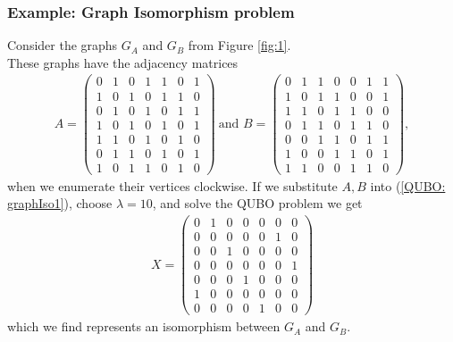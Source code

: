 \documentclass{article}
\begin{document}
\subsubsection{Example: Graph Isomorphism problem}
Consider the graphs \(G_A\) and \(G_B\) from Figure \ref{fig:1}. \\

\noindent These graphs have the adjacency matrices
\begin{align*}
    A = \begin{pmatrix}
        0 & 1 & 0 & 1 & 1 & 0 & 1 \\
        1 & 0 & 1 & 0 & 1 & 1 & 0 \\
        0 & 1 & 0 & 1 & 0 & 1 & 1 \\
        1 & 0 & 1 & 0 & 1 & 0 & 1 \\
        1 & 1 & 0 & 1 & 0 & 1 & 0 \\
        0 & 1 & 1 & 0 & 1 & 0 & 1 \\
        1 & 0 & 1 & 1 & 0 & 1 & 0
    \end{pmatrix} \: \text{and }
    B = \begin{pmatrix}
        0 & 1 & 1 & 0 & 0 & 1 & 1 \\
        1 & 0 & 1 & 1 & 0 & 0 & 1 \\
        1 & 1 & 0 & 1 & 1 & 0 & 0 \\
        0 & 1 & 1 & 0 & 1 & 1 & 0 \\
        0 & 0 & 1 & 1 & 0 & 1 & 1 \\
        1 & 0 & 0 & 1 & 1 & 0 & 1 \\
        1 & 1 & 0 & 0 & 1 & 1 & 0
    \end{pmatrix},
\end{align*}
when we enumerate their vertices clockwise. If we substitute \(A, B\) into (\ref{QUBO: graphIso1}), choose \(\lambda = 10\), and solve the QUBO problem we get
\begin{align*}
    X = \begin{pmatrix}
        0 & 1 & 0 & 0 & 0 & 0 & 0 \\
        0 & 0 & 0 & 0 & 0 & 1 & 0 \\
        0 & 0 & 1 & 0 & 0 & 0 & 0 \\
        0 & 0 & 0 & 0 & 0 & 0 & 1 \\
        0 & 0 & 0 & 1 & 0 & 0 & 0 \\
        1 & 0 & 0 & 0 & 0 & 0 & 0 \\
        0 & 0 & 0 & 0 & 1 & 0 & 0
    \end{pmatrix}
\end{align*}
which we find represents an isomorphism between \(G_A\) and \(G_B\).\\
\end{document}
